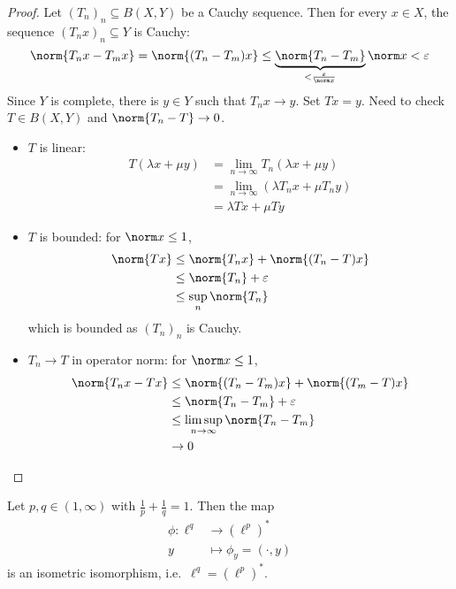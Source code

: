 \documentclass[a4paper]{article}
\begin{document}
\begin{proof}
  Let \((T_n)_n \subseteq B(X, Y)\) be a Cauchy sequence. Then for every \(x \in X\), the sequence \((T_nx)_n \subseteq Y\) is Cauchy:
  \[
    \norm{T_n x - T_mx}
    = \norm{(T_n - T_m) x}
    \leq \underbrace{\norm{T_n - T_m}}_{< \frac{\varepsilon}{\norm x}} \norm x
    < \varepsilon
  \]
  Since \(Y\) is complete, there is \(y \in Y\) such that \(T_nx \to y\). Set \(Tx = y\). Need to check \(T \in B(X, Y)\) and \(\norm{T_n - T} \to 0\).
  \begin{itemize}
  \item \(T\) is linear:
    \begin{align*}
      T(\lambda x + \mu y)
      &= \lim_{n \to \infty} T_n(\lambda x + \mu y) \\
      &= \lim_{n \to \infty} (\lambda T_n x + \mu T_n y) \\
      &= \lambda Tx + \mu Ty
    \end{align*}
  \item \(T\) is bounded: for \(\norm x \leq 1\),
    \begin{align*}
      \norm{Tx}
      &\leq \norm{T_nx} + \norm{(T_n - T) x} \\
      &\leq \norm{T_n} + \varepsilon \\
      &\leq \sup_n \norm{T_n}
    \end{align*}
    which is bounded as \((T_n)_n\) is Cauchy.
  \item \(T_n \to T\) in operator norm: for \(\norm x \leq 1\),
    \begin{align*}
      \norm{T_n x - Tx}
      &\leq \norm{(T_n - T_m) x} + \norm{(T_m - T) x} \\
      &\leq \norm{T_n - T_m} + \varepsilon \\
      &\leq \limsup_{n \to \infty} \norm{T_n - T_m} \\
      &\to 0
    \end{align*}
  \end{itemize}
\end{proof}

\begin{theorem}
  Let \(p, q \in (1, \infty)\) with \(\frac{1}{p} + \frac{1}{q} = 1\). Then the map
  \begin{align*}
    \phi: \ell^q &\to (\ell^p)^* \\
    y &\mapsto \phi_y = (\cdot, y)
  \end{align*}
  is an isometric isomorphism, i.e.\ \(\ell^q = (\ell^p)^*\).
\end{theorem}
\end{document}
